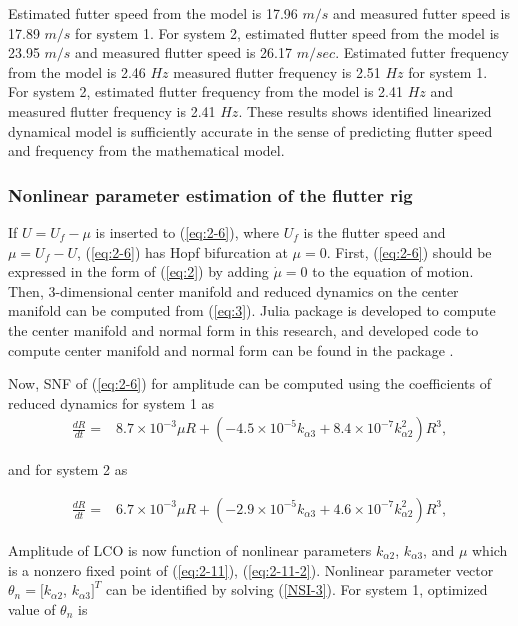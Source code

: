 \documentclass[openacc]{rsproca_new}%
\newcommand{\Eref}[1]{(\ref{#1})}
\begin{document}
Estimated futter speed from the model is 17.96 $m/s$ and measured futter speed is 17.89 $m/s$ for system 1. For system 2, estimated flutter speed from the model is 23.95 $m/s$ and measured flutter speed is 26.17 $m/sec$. Estimated futter frequency from the model is 2.46 $Hz$ measured flutter frequency is 2.51 $Hz$ for system 1. For system 2, estimated flutter frequency from the model is 2.41 $Hz$ and measured flutter frequency is 2.41 $Hz$. These results shows identified linearized dynamical model is sufficiently accurate in the sense of predicting flutter speed and frequency from the mathematical model.

\subsubsection{Nonlinear parameter estimation of the flutter rig}\label{nonlinear}

If $U=U_f-\mu$ is inserted to \Eref{eq:2-6}, where $U_f$ is the flutter speed and $\mu=U_f-U$, \Eref{eq:2-6} has Hopf bifurcation at $\mu=0$. First, \Eref{eq:2-6} should be expressed in the form of \Eref{eq:2} by adding $\dot \mu=0$ to the equation of motion. Then, 3-dimensional center manifold and reduced dynamics on the center manifold can be computed from \Eref{eq:3}. Julia \cite{bezanson2017julia} package is developed to compute the center manifold and normal form in this research, and developed code to compute center manifold and normal form can be found in the package \cite{hopfNF}.

Now, SNF of \Eref{eq:2-6} for amplitude can be computed using the coefficients of reduced dynamics for system 1 as
\begin{align}\label{eq:2-11}
\frac{dR}{dt}=&8.7\times 10^{-3}\mu R+(- 4.5 \times 10^{-5}  k_{\alpha 3} + 8.4 \times 10^{-7} k_{\alpha 2}^2)R^3,
\end{align}

\noindent and for system 2 as

\begin{align}\label{eq:2-11-2}
\frac{dR}{dt}=&6.7\times 10^{-3}\mu R+(- 2.9 \times 10^{-5}  k_{\alpha 3} + 4.6 \times 10^{-7} k_{\alpha 2}^2)R^3,
\end{align}

\noindent Amplitude of LCO is now function of nonlinear parameters $k_{\alpha2}$, $k_{\alpha3}$, and $\mu$ which is a nonzero fixed point of \Eref{eq:2-11}, \Eref{eq:2-11-2}. Nonlinear parameter vector $\theta_n=[k_{\alpha2}$, $k_{\alpha3}]^T$ can be identified by solving \Eref{NSI-3}. For system 1, optimized value of $\theta_n$ is
\end{document}
